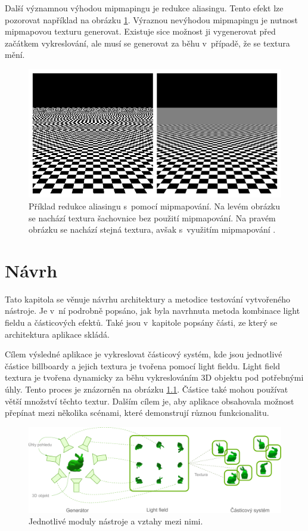 Další významnou výhodou mipmapingu je redukce aliasingu. Tento efekt lze pozorovat například na obrázku \ref{fig:mipmap_alias}. Výraznou nevýhodou mipmapingu je nutnost mipmapovou texturu generovat. Existuje sice možnost ji vygenerovat před začátkem vykreslování, ale musí se generovat za běhu v~případě, že se textura mění. 

\begin{figure}[H]
	\centering
		\includegraphics[width=1.0\textwidth]{obrazky-figures/mipmap1.png}
	\caption{Příklad redukce aliasingu s~pomocí mipmapování. Na levém obrázku se nachází textura šachovnice bez použití mipmapování. Na pravém obrázku se nachází stejná textura, avšak s~využitím mipmapování \protect\footnotemark.}
	\label{fig:mipmap_alias}
\end{figure}

\chapter{Návrh}
Tato kapitola se věnuje návrhu architektury a metodice testování vytvořeného nástroje. Je v~ní podrobně popsáno, jak byla navrhnuta metoda kombinace light fieldu a částicových efektů. Také jsou v~kapitole popsány části, ze který se architektura aplikace skládá.

Cílem výsledné aplikace je vykreslovat částicový systém, kde jsou jednotlivé částice billboardy a jejich textura je tvořena pomocí light fieldu. Light field textura je tvořena dynamicky za běhu vykreslováním 3D objektu pod potřebnými úhly. Tento proces je znázorněn na obrázku \ref{fig:navrh_bp}. Částice také mohou používat větší množství těchto textur. Dalším cílem je, aby aplikace obsahovala možnost přepínat mezi několika scénami, které demonstrují různou funkcionalitu.

\begin{figure}[H]
	\centering
		\includegraphics[width=1.0\textwidth]{obrazky-figures/bpnavrh.pdf}
	\caption{Jednotlivé moduly nástroje a vztahy mezi nimi.}
	\label{fig:navrh_bp}
\end{figure}

